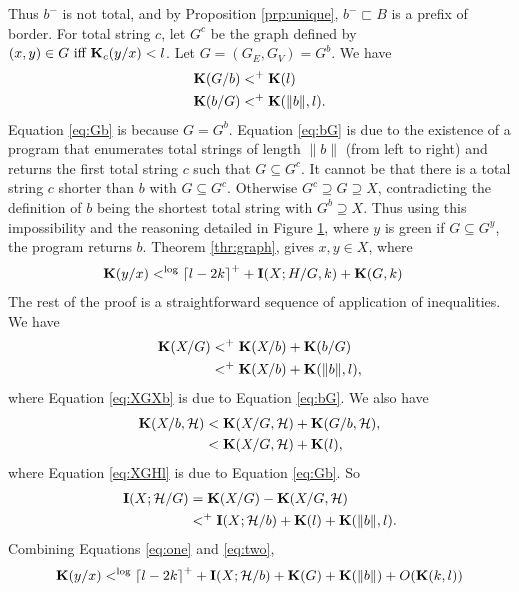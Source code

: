 \documentclass[11pt]{article}\textwidth 6.5in\textheight 9in
\begin{document}
\begin{prf}
\begin{figure}
  \label{fig:totalb}
\end{figure}Thus $b^-$ is not total, and by Proposition \ref{prp:unique}, $b^-\sqsubset B$ is a prefix of border. For total string $c$, let $G^c$ be the graph defined by $(x,y)\in G\textrm{ iff }{\mathbf K}_c(y/x)< l$. Let $G=(G_E,G_V)=G^b$.  We have
	\begin{align} 
	\label{eq:Gb}
	{\mathbf K}(G/b)&<^+ {\mathbf K}(l)\\
	\label{eq:bG}
	{\mathbf K}(b/G)&<^+ {\mathbf K}(\|b\|,l).
	\end{align}
Equation \ref{eq:Gb} is because $G=G^b$. Equation \ref{eq:bG} is due to the existence of a program that enumerates total strings of length $\|b\|$ (from left to right) and returns the first total string $c$ such that $G\subseteq G^c$. It cannot be that there is a total string $c$ shorter than $b$ with $G\subseteq G^c$. Otherwise $G^c \supseteq G\supseteq X$, contradicting the definition of $b$ being the shortest total string with $G^b\supseteq X$. Thus using this impossibility and the reasoning detailed in Figure \ref{fig:totalb}, where $y$ is green if $G\subseteq G^y$, the program returns $b$. Theorem \ref{thr:graph}, gives $x, y \in X$, where
	\begin{align}
	\label{eq:one}
{\mathbf K}(y/x) & <^{\log} {\lceil l-2k\rceil}^++{\mathbf I}(X;H/G,k)+{\mathbf K}(G,k)
	\end{align}
	The rest of the proof is a straightforward sequence of application of inequalities. We have 
	\begin{align}
	\nonumber
	{\mathbf K}(X/G)&<^+ {\mathbf K}(X/b)+{\mathbf K}(b/G)\\
	\label{eq:XGXb}
	&<^+ {\mathbf K}(X/b)+{\mathbf K}(\|b\|,l),
	\end{align}
	where Equation \ref{eq:XGXb} is due to Equation \ref{eq:bG}.
	We also have
	 \begin{align}
	 \nonumber
	 {\mathbf K}(X/b,{\mathcal H})&<{\mathbf K}(X/G,{\mathcal H})+{\mathbf K}(G/b,{\mathcal H}),\\
	 \label{eq:XGHl}
	 &<{\mathbf K}(X/G,{\mathcal H})+{\mathbf K}(l),
	 \end{align}
	 where Equation \ref{eq:XGHl} is due to Equation \ref{eq:Gb}. So
	 \begin{align}
	 \nonumber
	 {\mathbf I}(X;\mathcal{H}/G) &={\mathbf K}(X/G)-{\mathbf K}(X/G,\mathcal{H})\\
	 \label{eq:two}
	 &<^+  {\mathbf I}(X;\mathcal{H}/b)+{\mathbf K}(l)+{\mathbf K}(\|b\|,l). 
	 \end{align}
	 Combining Equations \ref{eq:one} and \ref{eq:two},
	\begin{align}
	\nonumber
	\K(y/x) & \lel \ceil{l-2k}^++\I(X;\ch/b)+\K(G)+\K(\|b\|)+O(\K(k,l))\\
	\label{eq:Gtob}

\end{align}
\end{prf}
\end{document}
